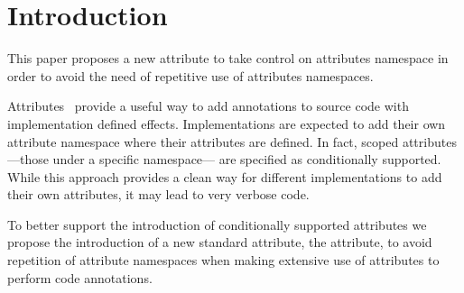 \section{Introduction}

This paper proposes a new attribute to take control on attributes namespace
in order to avoid the need of repetitive use of attributes namespaces.

Attributes~\cite{n2761} provide a useful way to add annotations to source code with
implementation defined effects. Implementations are expected to add their
own attribute namespace where their attributes are defined. In fact,
scoped attributes ---those under a specific namespace--- are specified
as conditionally supported. While this approach
provides a clean way for different implementations to add their own attributes,
it may lead to very verbose code.

To better support the introduction of conditionally supported attributes we
propose the introduction of a new standard attribute, the  attribute,
to avoid repetition of attribute namespaces when making extensive use
of attributes to perform code annotations.

